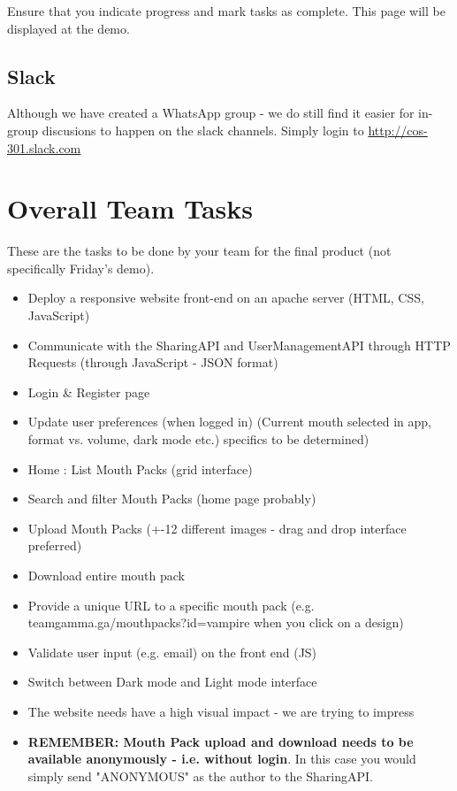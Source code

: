 \documentclass{article}
\begin{document}
Ensure that you indicate progress and mark tasks as complete. This page will be displayed at the demo.

\subsection{Slack}
Although we have created a WhatsApp group - we do still find it easier for in-group discusions to happen on the slack channels. Simply login to \url{http://cos-301.slack.com}

\newpage

\section{Overall Team Tasks}
These are the tasks to be done by your team for the final product (not specifically Friday's demo).

\begin{itemize}
    \item Deploy a responsive website front-end on an apache server (HTML, CSS, JavaScript)
    \item Communicate with the SharingAPI and UserManagementAPI through HTTP Requests (through JavaScript - JSON format)
    \item Login \& Register page
    \item Update user preferences (when logged in) (Current mouth selected in app, format vs. volume, dark mode etc.) specifics to be determined)
    \item Home : List Mouth Packs (grid interface)
    \item Search and filter Mouth Packs (home page probably)
    \item Upload Mouth Packs (+-12 different images - drag and drop interface preferred)
    \item Download entire mouth pack
    \item Provide a unique URL to a specific mouth pack (e.g. teamgamma.ga/mouthpacks?id=vampire when you click on a design)
    \item Validate user input (e.g. email) on the front end (JS)
    \item Switch between Dark mode and Light mode interface
    \item The website needs have a high visual impact - we are trying to impress
    \item \textbf{REMEMBER: Mouth Pack upload and download needs to be available anonymously - i.e. without login}. In this case you would simply send "ANONYMOUS" as the author to the SharingAPI.
\end{itemize}
\end{document}
